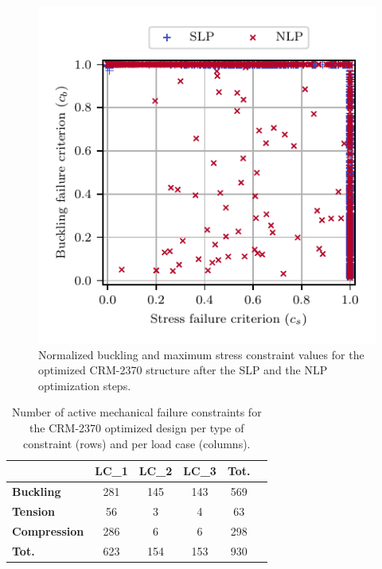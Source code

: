 \begin{figure}
    \centering
    \includegraphics[width=0.8\linewidth]{figures/07_aeronautic/18_failure new/failure_max.pdf}
     \caption{Normalized buckling and maximum stress constraint values for the optimized CRM-2370 structure after the SLP and the NLP optimization steps.}
    \label{fig:fail-crm}
\end{figure}

\begin{table}
\small
\centering
\begin{tabular}{lS[table-format=3.0]S[table-format=3.0]S[table-format=3.0]S[table-format=3.0]S[table-format=3.0]}
\toprule
                     & \textbf{LC\_1} & \textbf{LC\_2} & \textbf{LC\_3} & \textbf{Tot.} \\ \midrule
\textbf{Buckling}    & 281           & 145           & 143           & 569           \\
\textbf{Tension}     & 56            & 3             & 4             & 63            \\
\textbf{Compression} & 286           & 6             & 6             & 298           \\
\midrule
\textbf{Tot.}        & 623           & 154           & 153           & 930          \\
\bottomrule
\end{tabular}
\caption{Number of active mechanical failure constraints for the CRM-2370 optimized design per type of constraint (rows) and per load case (columns).}
\label{tab:07_constrNLP}
\end{table}

